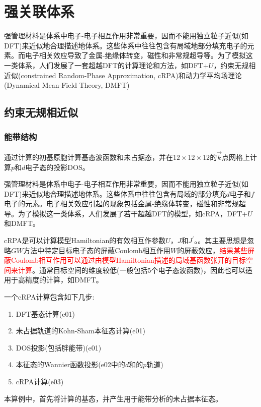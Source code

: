 \section{强关联体系}
强管理材料是体系中电子-电子相互作用非常重要，因而不能用独立粒子近似(如\textrm{DFT})来近似地合理描述地体系。这些体系中往往包含有局域地部分填充电子的元素。而电子相关效应导致了金属-绝缘体转变，磁性和非常规超导等。为了模拟这一类体系，人们发展了一套超越\textrm{DFT}的计算理论和方法，如\textrm{DFT}+$U$，约束无规相近似\textrm{(constrained Random-Phase Approximation, cRPA)}和动力学平均场理论\textrm{(Dynamical Mean-Field Theory, DMFT)}

\subsection{约束无规相近似}
\subsubsection{能带结构}
通过计算的初基原胞计算基态波函数和未占据态，并在$12\times12\times12$的$\vec k$点网格上计算$p$和$d$电子态的投影\textrm{DOS}。

强管理材料是体系中电子-电子相互作用非常重要，因而不能用独立粒子近似(如\textrm{DFT})来近似地合理描述地体系。这些体系中往往包含有局域的部分填充$d$电子和$f$电子的元素。电子相关效应引起的现象包括金属-绝缘体转变，磁性和非常规超导。为了模拟这一类体系，人们发展了若干超越\textrm{DFT}的模型，如\textrm{cRPA}，\textrm{DFT+}$U$和\textrm{DMFT}。%

\textrm{cRPA}是可以计算模型\textrm{Hamiltonian}的有效相互作参数$U$，$J$和$J^{\prime}$。。其主要思想是忽略$GW$方法中特定目标电子态的屏蔽\textrm{Coulomb}相互作用$W$的屏蔽效应，\textcolor{red}{结果某些屏蔽\textrm{Coulomb}相互作用可以通过由模型\textrm{Hamiltonian}描述的局域基函数张开的目标空间来计算}。通常目标空间的维度较低(一般包括5个电子态波函数)，因此也可以适用于高精度的计算，如\textrm{DMFT}。

一个\textrm{cRPA}计算包含如下几步:
\begin{enumerate}
	\item \textrm{DFT}基态计算\textrm{(e01)}
	\item 未占据轨道的\textrm{Kohn-Sham}本征态计算\textrm{(e01)}
	\item \textrm{DOS}投影(包括胖能带)\textrm{(e01)}
	\item 本征态的\textrm{Wannier}函数投影\textrm{(e02中的$d$和的$p$轨道)}
	\item \textrm{cRPA}计算\textrm{(e03)}
\end{enumerate}
本算例中，首先将计算的基态，并产生用于能带分析的未占据本征态。

